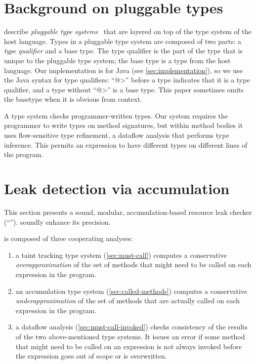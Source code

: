 \section{Background on pluggable types}
\label{sec:background}

 describe
\emph{pluggable type systems}~\cite{FosterFFA99}
that are layered on top of the type system of the host
language.  Types in a pluggable type system are composed of two parts:
a \emph{type qualifier} and a base type. The type qualifier is the
part of the type that is unique to the pluggable type system; the base
type is a type from the host language. Our implementation is for Java
(see \cref{sec:implementation}), so we use the Java syntax for type
qualifiers: ``\<@>'' before a type indicates that it is a type
qualifier, and a type without ``\<@>'' is a base type.
This paper sometimes omits the basetype when it is obvious from context.

A type system checks programmer-written types.  Our system requires the
programmer to write types on method signatures, but within method bodies it
uses flow-sensitive type refinement, a dataflow analysis that performs type
inference.  This permits an expression to have different types on different
lines of the program.



\section{Leak detection via accumulation}
\label{sec:base-type-systems}

This section presents a sound, modular, accumulation-based
resource leak checker (``\tool'').
soundly enhance its precision.

\Tool is composed of three cooperating analyses:
\begin{enumerate}
\item a taint tracking type system (\cref{sec:must-call}) computes a conservative
  \emph{overapproximation} of the set of methods that might need to be called
  on each expression in the program.
\item an accumulation type system (\cref{sec:called-methods}) computes
  a conservative \emph{underapproximation} of the set of methods that are
  actually called on each expression in the program.
\item a dataflow analysis (\cref{sec:must-call-invoked}) checks consistency of the results of the two
  above-mentioned type systems.  It issues an error if some
  method that might need to be called on an expression is not always invoked before the
  expression goes out of scope or is overwritten.
\end{enumerate}

